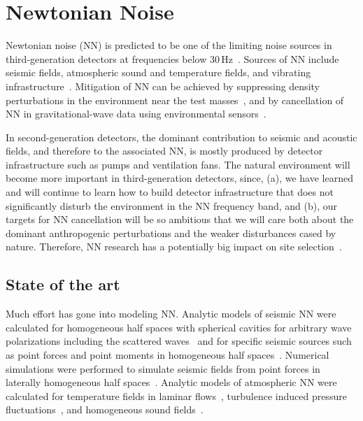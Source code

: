 
\chapter{Newtonian Noise}
\label{sec:Newtonian_Noise}
\vspace{0.5cm}
Newtonian noise (NN) is predicted to be one of the limiting noise sources in third-generation detectors at frequencies below 30\,Hz~\cite{Saulson:NN,Har2015}. Sources of NN include seismic fields, atmospheric sound and temperature fields, and vibrating infrastructure~\cite{HuTh1998,BeEA1998,Cre2008,FiEA2018,Har2015}. Mitigation of NN can be achieved by suppressing density perturbations in the environment near the test masses~\cite{HaHi2014}, and by cancellation of NN in gravitational-wave data using environmental sensors~\cite{Cel2000,CoEA2016a}.

\begin{samepage} %

In second-generation detectors, the dominant contribution to seismic and acoustic fields, and therefore to the associated NN, is mostly produced by detector infrastructure such as pumps and ventilation fans. The natural environment will become more important in third-generation detectors, since, (a), we have learned and will continue to learn how to build detector infrastructure that does not significantly disturb the environment in the NN frequency band, and (b), our targets for NN cancellation will be so ambitious that we will care both about the dominant anthropogenic perturbations and the weaker disturbances cased by nature. Therefore, NN research has a potentially big impact on site selection~\cite{BeEA2010}. 


\section{State of the art}
Much effort has gone into modeling NN. Analytic models of seismic NN were calculated for homogeneous half spaces with spherical cavities for arbitrary wave polarizations including the scattered waves~\cite{Har2015} and for specific seismic sources such as point forces and point moments in homogeneous half spaces~\cite{HaEA2015,Har2016}. Numerical simulations were performed to simulate seismic fields from point forces in laterally homogeneous half spaces~\cite{BeEA2010c}. Analytic models of atmospheric NN were calculated for temperature fields in laminar flows~\cite{Cre2008}, turbulence induced pressure fluctuations~\cite{Har2015}, and homogeneous sound fields~\cite{FiEA2018}. 

\end{samepage} %

